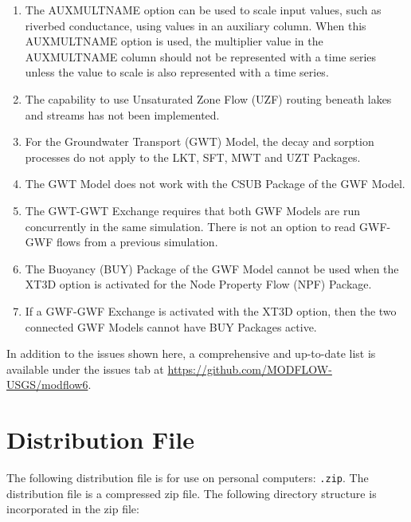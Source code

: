 \documentclass[11pt,twoside,twocolumn]{usgsreport}
\begin{document}
\begin{enumerate}

\item
The AUXMULTNAME option can be used to scale input values, such as riverbed conductance, using values in an auxiliary column.  When this AUXMULTNAME option is used, the multiplier value in the AUXMULTNAME column should not be represented with a time series unless the value to scale is also represented with a time series.  

\item
The capability to use Unsaturated Zone Flow (UZF) routing beneath lakes and streams has not been implemented.

\item
For the Groundwater Transport (GWT) Model, the decay and sorption processes do not apply to the LKT, SFT, MWT and UZT Packages.

\item
The GWT Model does not work with the CSUB Package of the GWF Model.  

\item
The GWT-GWT Exchange requires that both GWF Models are run concurrently in the same simulation.  There is not an option to read GWF-GWF flows from a previous simulation.

\item
The Buoyancy (BUY) Package of the GWF Model cannot be used when the XT3D option is activated for the Node Property Flow (NPF) Package.

\item
If a GWF-GWF Exchange is activated with the XT3D option, then the two connected GWF Models cannot have BUY Packages active.

\end{enumerate}

In addition to the issues shown here, a comprehensive and up-to-date list is available under the issues tab at \url{https://github.com/MODFLOW-USGS/modflow6}.


\section{Distribution File}
The following distribution file is for use on personal computers: \texttt{\modflowversion.zip}.  The distribution file is a compressed zip file. The following directory structure is incorporated in the zip file:


\end{document}
